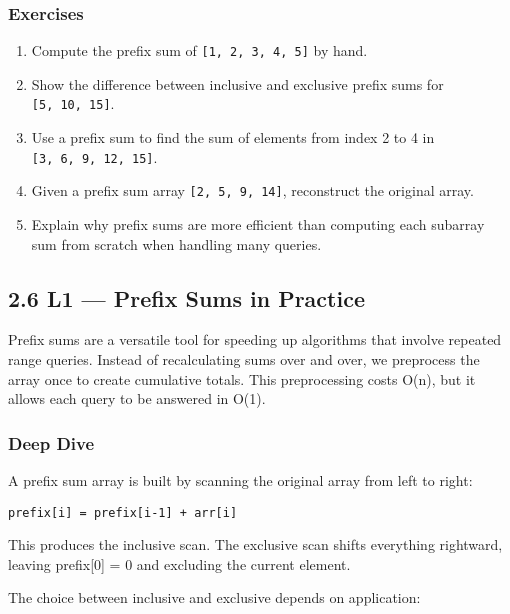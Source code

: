 \documentclass[
  letterpaper,
  DIV=11,
  numbers=noendperiod]{scrreprt}
\providecommand{\tightlist}{%
  \setlength{\itemsep}{0pt}\setlength{\parskip}{0pt}}
\begin{document}
\subsubsection{Exercises}\label{exercises-27}

\begin{enumerate}
\def\labelenumi{\arabic{enumi}.}
\tightlist
\item
  Compute the prefix sum of \texttt{{[}1,\ 2,\ 3,\ 4,\ 5{]}} by hand.
\item
  Show the difference between inclusive and exclusive prefix sums for
  \texttt{{[}5,\ 10,\ 15{]}}.
\item
  Use a prefix sum to find the sum of elements from index 2 to 4 in
  \texttt{{[}3,\ 6,\ 9,\ 12,\ 15{]}}.
\item
  Given a prefix sum array \texttt{{[}2,\ 5,\ 9,\ 14{]}}, reconstruct
  the original array.
\item
  Explain why prefix sums are more efficient than computing each
  subarray sum from scratch when handling many queries.
\end{enumerate}

\subsection{2.6 L1 --- Prefix Sums in
Practice}\label{l1-prefix-sums-in-practice}

Prefix sums are a versatile tool for speeding up algorithms that involve
repeated range queries. Instead of recalculating sums over and over, we
preprocess the array once to create cumulative totals. This
preprocessing costs O(n), but it allows each query to be answered in
O(1).

\subsubsection{Deep Dive}\label{deep-dive-19}

A prefix sum array is built by scanning the original array from left to
right:

\begin{verbatim}
prefix[i] = prefix[i-1] + arr[i]
\end{verbatim}

This produces the inclusive scan. The exclusive scan shifts everything
rightward, leaving prefix{[}0{]} = 0 and excluding the current element.

The choice between inclusive and exclusive depends on application:
\end{document}
